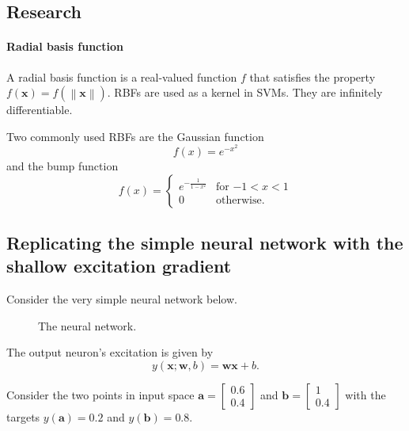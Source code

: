 \documentclass{article}
\let\vec\mathbf
\newcommand{\norm}[1]{\left\lVert#1\right\rVert}
\begin{document}
\subsection{Research}

\paragraph{Radial basis function}
A radial basis function is a real-valued function $f$ that satisfies the property $f(\vec{x}) = f(\norm{\vec{x}})$. 
RBFs are used as a kernel in SVMs. 
They are infinitely differentiable.

Two commonly used RBFs are the Gaussian function
$$ f(x) = e^{-x^2} $$
and the bump function
$$ f(x) = 
\begin{cases}
    e^{-\frac{1}{1-x^2}} & \text{for $-1<x<1$} \\
    0 & \text{otherwise}.
\end{cases}
$$

\subsection{Replicating the simple neural network with the shallow excitation gradient}
\label{sec:week5:shallownet}
Consider the very simple neural network below. 
\begin{figure}[h]
    \begin{center}
    \end{center}
    \caption{The neural network.}
    \label{fig:week5:shallownet}
\end{figure}

The output neuron's excitation is given by 
\begin{equation*}
    y(\vec{x}; \vec{w}, b) = \vec{w} \vec{x} + b.
\end{equation*}

Consider the two points in input space
$\vec{a} = 
\begin{bmatrix}
    0.6 \\ 0.4
\end{bmatrix}$
and
$\vec{b} = 
\begin{bmatrix}
    1 \\ 0.4
\end{bmatrix}$
with the targets $y(\vec{a}) = 0.2$ and $y(\vec{b}) = 0.8$.
\end{document}
